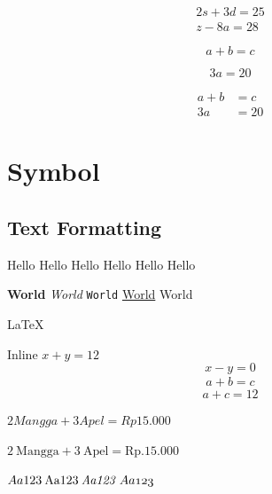 \documentclass{article}
\begin{document}


    \begin{align*}
        2s + 3d = 25\\
        z - 8a = 28 
    \end{align*}

    \begin{equation*}
        a + b = c
    \end{equation*}

    \begin{equation*}
        3a = 20
    \end{equation*}

    \begin{align*}
        a + b &= c\\
        3a &= 20 
    \end{align*}

    \newpage
    \section{Symbol}
    \subsection{Text Formatting}

    {\tiny Hello} {\small Hello}
    {\normalsize Hello} Hello
    {\large Hello} {\huge Hello}

    \textbf{World}
    \textit{World}
    \texttt{World}
    \underline{World}
    \textrm{World}

    \LaTeX

    Inline $x + y = 12$
    \begin{equation}
        x - y = 0
    \end{equation}
    \begin{align}
        a + b = c
    \end{align}
    $$a + c = 12$$

    $2 Mangga + 3 Apel = Rp 15.000$

    $2 \: \textrm{Mangga} + 3 \: \textrm{Apel} 
    = \textrm{Rp.} 15.000$

    $Aa123 \: \mathrm{Aa123} \:
    \mathit{Aa123} \: \mathnormal{Aa123}$
\end{document}
